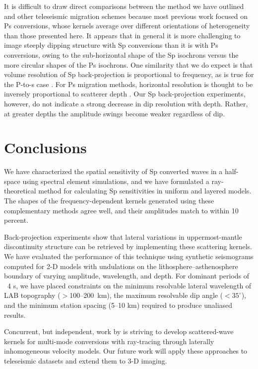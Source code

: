 \documentclass[referee]{gji}
\begin{document}
It is difficult to draw direct comparisons between the method we have outlined and other teleseismic migration schemes \citep[e.g.,][]{Revenaugh1995, Bostock1999, Ryberg2000, Sheehan2000, Poppeliers2003, Frederiksen2004, Cheng2016} because most previous work focused on Ps conversions, whose kernels average over different orientations of heterogeneity than those presented here.  It appears that in general it is more challenging to image steeply dipping structure with Sp conversions than it is with Ps conversions, owing to the sub-horizontal shape of the Sp isochrons versus the more circular shapes of the Ps isochrons.  One similarity that we do expect is that volume resolution of Sp back-projection is proportional to frequency, as is true for the P-to-s case \citep{Rondenay2005}.  For Ps migration methods, horizontal resolution is thought to be inversely proportional to scatterer depth \citep{Poppeliers2003}.  Our Sp back-projection experiments, however, do not indicate a strong decrease in dip resolution with depth. Rather, at greater depths the amplitude swings become weaker regardless of dip.

\section{Conclusions}

We have characterized the spatial sensitivity of Sp converted waves in a half-space using spectral element simulations, and we have formulated a ray-theoretical method for calculating Sp sensitivities in uniform and layered models.  The shapes of the frequency-dependent kernels generated using these complementary methods agree well, and their amplitudes match to within 10 percent.  

Back-projection experiments show that lateral variations in uppermost-mantle discontinuity structure can be retrieved by implementing these scattering kernels.  We have evaluated the performance of this technique using synthetic seismograms computed for 2-D models with undulations on the lithosphere--asthenosphere boundary of varying amplitude, wavelength, and depth. For dominant periods of ~4 s, we have placed constraints on the minimum resolvable lateral wavelength of LAB topography ($>$100--200~km), the maximum resolvable dip angle ($<35^\circ$), and the minimum station spacing (5--10 km) required to produce unaliased results.

Concurrent, but independent, work by \citet{Hansen} is striving to develop scattered-wave kernels for multi-mode conversions with ray-tracing through laterally inhomogeneous velocity models.  Our future work will apply these approaches to teleseismic datasets and extend them to 3-D imaging. 
\end{document}
